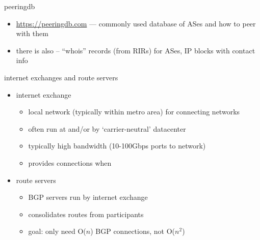 

\begin{frame}{peeringdb}
    \begin{itemize}
    \item \url{https://peeringdb.com} --- commonly used database of ASes and how to peer with them
    \item there is also -- ``whois'' records (from RIRs) for ASes, IP blocks with contact info
    \end{itemize}
\end{frame}

\begin{frame}{internet exchanges and route servers}
    \begin{itemize}
    \item internet exchange
        \begin{itemize}
        \item local network (typically within metro area) for connecting networks
        \item often run at and/or by `carrier-neutral' datacenter
        \item typically high bandwidth (10-100Gbps ports to network)
        \item provides connections when
        \end{itemize}
    \vspace{.5cm}
    \item route servers
        \begin{itemize}
        \item BGP servers run by internet exchange
        \item consolidates routes from participants
        \item goal: only need O($n$) BGP connections, not O($n^2$)
        \end{itemize}
    \end{itemize}
\end{frame}
